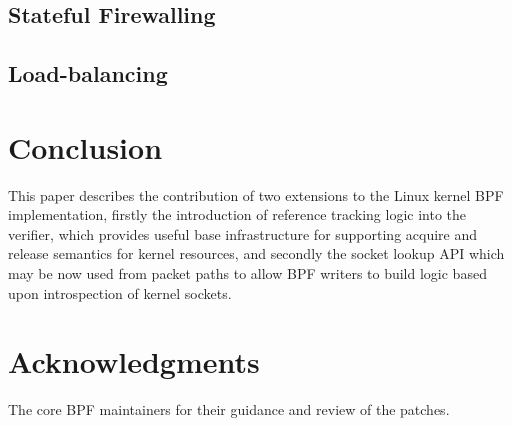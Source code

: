 \documentclass[10pt,sigconf,authorversion]{lpc}
\begin{document}
\subsection{Stateful Firewalling}

\subsection{Load-balancing}

\section{Conclusion}

This paper describes the contribution of two extensions to the Linux kernel BPF
implementation, firstly the introduction of reference tracking logic into the
verifier, which provides useful base infrastructure for supporting acquire and
release semantics for kernel resources, and secondly the socket lookup API
which may be now used from packet paths to allow BPF writers to build logic
based upon introspection of kernel sockets.

\section{Acknowledgments}

The core BPF maintainers for their guidance and review of the patches.



\end{document}
